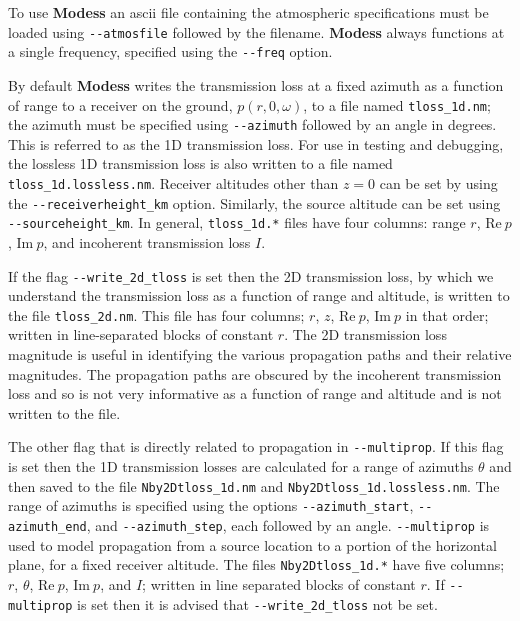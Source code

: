 To use {\bf Modess} an ascii file containing the atmospheric specifications must be loaded using \verb+--atmosfile+ followed by the filename. {\bf Modess} always functions at a single frequency, specified using the \verb+--freq+ option. 

By default {\bf Modess} writes the transmission loss at a fixed azimuth as a function of range to a receiver on the ground, $p(r,0,\omega)$, to a file named \verb+tloss_1d.nm+; the azimuth must be specified using \verb+--azimuth+ followed by an angle in degrees. This is referred to as the 1D transmission loss. For use in testing and debugging, the lossless 1D transmission loss is also written to a file named \verb+tloss_1d.lossless.nm+. Receiver altitudes other than $z=0$ can be set by using the \verb+--receiverheight_km+ option. Similarly, the source altitude can be set using \verb+--sourceheight_km+. In general, \verb+tloss_1d.*+ files have four columns: range $r$, $\text{Re}\ p$, $\text{Im}\ p$, and incoherent transmission loss $I$. 

If the flag \verb+--write_2d_tloss+ is set then the 2D transmission loss, by which we understand the transmission loss as a function of range and altitude, is written to the file \verb+tloss_2d.nm+.  This file has four columns; $r$, $z$, $\text{Re}\ p$, $\text{Im}\ p$ in that order; written in line-separated blocks of constant $r$. The 2D transmission loss magnitude is useful in identifying the various propagation paths and their relative magnitudes. The propagation paths are obscured by the incoherent transmission loss and so is not very informative as a function of range and altitude and is not written to the file. 

The other flag that is directly related to propagation in \verb+--multiprop+. If this flag is set then the 1D transmission losses are calculated for a range of azimuths $\theta$ and then saved to the file \verb+Nby2Dtloss_1d.nm+ and \verb+Nby2Dtloss_1d.lossless.nm+. The range of azimuths is specified using the options \verb+--azimuth_start+, \verb+--azimuth_end+, and \verb+--azimuth_step+, each followed by an angle. \verb+--multiprop+ is used to model propagation from a source location to a portion of the horizontal plane, for a fixed receiver altitude. The files \verb+Nby2Dtloss_1d.*+ have five columns; $r$, $\theta$, $\text{Re}\ p$, $\text{Im}\ p$, and $I$; written in line separated blocks of constant $r$. If \verb+--multiprop+ is set then it is advised that \verb+--write_2d_tloss+ not be set. 

